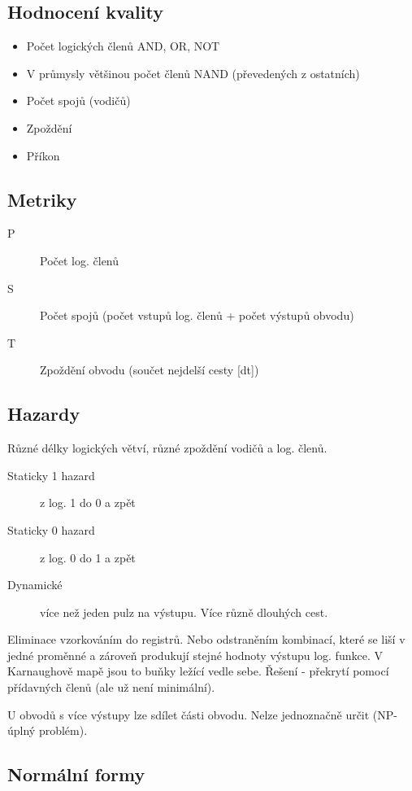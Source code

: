 \documentclass[a4wide]{report}
\begin{document}
\subsection{Hodnocení kvality}
\begin{itemize}
	\item Počet logických členů AND, OR, NOT
	\item V průmysly většinou počet členů NAND (převedených z ostatních)
	\item Počet spojů (vodičů)
	\item Zpoždění
	\item Příkon
\end{itemize}

\subsection{Metriky}
\begin{description}
	\item[P] Počet log. členů
	\item[S] Počet spojů (počet vstupů log. členů + počet výstupů obvodu)
	\item[T] Zpoždění obvodu (součet nejdelší cesty [dt])
\end{description}

\subsection{Hazardy}
Různé délky logických větví, různé zpoždění vodičů a log. členů.

\begin{description}
	\item[Staticky 1 hazard] z log. 1 do 0 a zpět
	\item[Staticky 0 hazard] z log. 0 do 1 a zpět
	\item[Dynamické] více než jeden pulz na výstupu. Více různě dlouhých cest.
\end{description}

Eliminace vzorkováním do registrů. Nebo odstraněním kombinací, které se liší v jedné proměnné a zároveň produkují stejné hodnoty výstupu log. funkce. V Karnaughově mapě jsou to buňky ležící vedle sebe. Řešení - překrytí pomocí přídavných členů (ale už není minimální).

U obvodů s více výstupy lze sdílet části obvodu. Nelze jednoznačně určit (NP-úplný problém).

\subsection{Normální formy}
\end{document}
